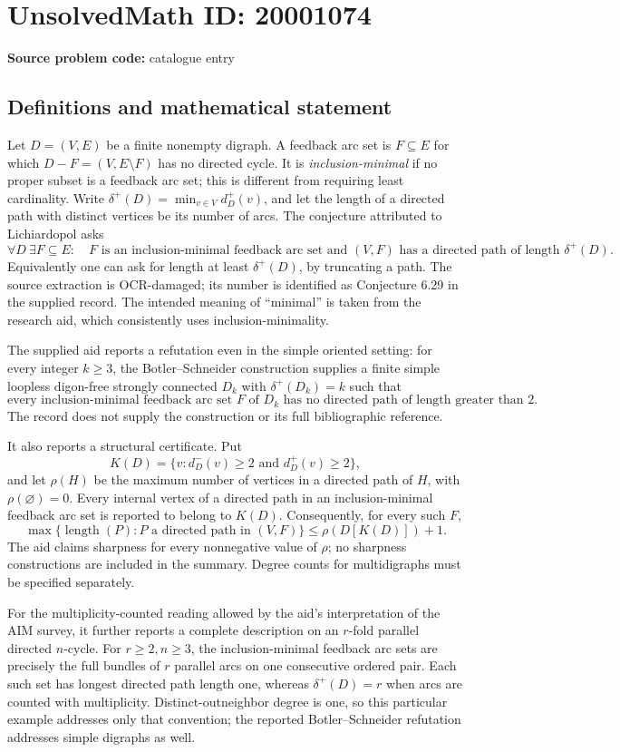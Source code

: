 \documentclass[11pt]{article}
\begin{document}
\section*{UnsolvedMath ID: 20001074}
\textbf{Source problem code:} catalogue entry
\subsection{Definitions and mathematical statement}
Let \(D=(V,E)\) be a finite nonempty digraph. A feedback arc set is \(F\subseteq E\) for which \(D-F=(V,E\setminus F)\) has no directed cycle. It is \emph{inclusion-minimal} if no proper subset is a feedback arc set; this is different from requiring least cardinality. Write \(\delta^+(D)=\min_{v\in V}d_D^+(v)\), and let the length of a directed path with distinct vertices be its number of arcs. The conjecture attributed to Lichiardopol asks
\[
 \forall D\ \exists F\subseteq E:\quad
 F\text{ is an inclusion-minimal feedback arc set and }
 (V,F)\text{ has a directed path of length }\delta^+(D).
\]
Equivalently one can ask for length at least \(\delta^+(D)\), by truncating a path. The source extraction is OCR-damaged; its number is identified as Conjecture 6.29 in the supplied record. The intended meaning of ``minimal'' is taken from the research aid, which consistently uses inclusion-minimality.

The supplied aid reports a refutation even in the simple oriented setting: for every integer \(k\geq3\), the Botler--Schneider construction supplies a finite simple loopless digon-free strongly connected \(D_k\) with \(\delta^+(D_k)=k\) such that
\[
 \text{every inclusion-minimal feedback arc set }F\text{ of }D_k
 \text{ has no directed path of length greater than }2.
\]
The record does not supply the construction or its full bibliographic reference.

It also reports a structural certificate. Put
\[
 K(D)=\{v:d_D^-(v)\geq2\text{ and }d_D^+(v)\geq2\},
\]
and let \(\rho(H)\) be the maximum number of vertices in a directed path of \(H\), with \(\rho(\varnothing)=0\). Every internal vertex of a directed path in an inclusion-minimal feedback arc set is reported to belong to \(K(D)\). Consequently, for every such \(F\),
\[
 \max\{\operatorname{length}(P):P\text{ a directed path in }(V,F)\}
 \leq\rho(D[K(D)])+1.
\]
The aid claims sharpness for every nonnegative value of \(\rho\); no sharpness constructions are included in the summary. Degree counts for multidigraphs must be specified separately.

For the multiplicity-counted reading allowed by the aid's interpretation of the AIM survey, it further reports a complete description on an \(r\)-fold parallel directed \(n\)-cycle. For \(r\geq2,n\geq3\), the inclusion-minimal feedback arc sets are precisely the full bundles of \(r\) parallel arcs on one consecutive ordered pair. Each such set has longest directed path length one, whereas \(\delta^+(D)=r\) when arcs are counted with multiplicity. Distinct-outneighbor degree is one, so this particular example addresses only that convention; the reported Botler--Schneider refutation addresses simple digraphs as well.
\end{document}
